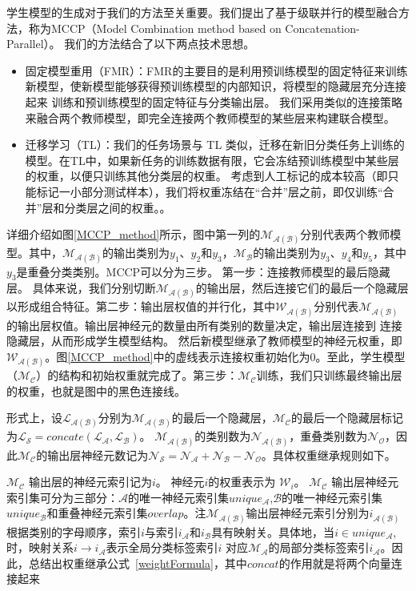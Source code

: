 \documentclass[fontset=macnew,UTF8]{article} %
\begin{document}
学生模型的生成对于我们的方法至关重要。我们提出了基于级联并行的模型融合方法，称为MCCP（Model Combination method based on Concatenation-Parallel）。 我们的方法结合了以下两点技术思想。

\begin{itemize}
	\item 固定模型重用（FMR）\cite{yang2017deep}：FMR的主要目的是利用预训练模型的固定特征来训练新模型，使新模型能够获得预训练模型的内部知识，将模型的隐藏层充分连接起来 训练和预训练模型的固定特征与分类输出层。 我们采用类似的连接策略来融合两个教师模型，即完全连接两个教师模型的某些层来构建联合模型。
	\item 迁移学习（TL）\cite{sung2022lst}：我们的任务场景与 TL 类似，迁移在新旧分类任务上训练的模型。在TL中，如果新任务的训练数据有限，它会冻结预训练模型中某些层的权重，以便只训练其他分类层的权重。 考虑到人工标记的成本较高（即只能标记一小部分测试样本），我们将权重冻结在“合并”层之前，即仅训练“合并”层和分类层之间的权重。。
\end{itemize}

详细介绍如图\ref{MCCP_method}所示，图中第一列的$\mathcal{M_{A(B)}}$分别代表两个教师模型。其中，$\mathcal{M_{A(B)}}$的输出类别为$\mathit{y_{1}}$、$\mathit{y_{2}}$和$\mathit{y_{3}}$，$\mathcal{M_{B}}$的输出类别为$\mathit{y_{3}}$、$\mathit{y_{4}}$和$\mathit{y_{5}}$，其中$\mathit{y_{3}}$是重叠分类类别。MCCP可以分为三步。 第一步：连接教师模型的最后隐藏层。 具体来说，我们分别切断$\mathcal{M_{A(B)}}$的输出层，然后连接它们的最后一个隐藏层以形成组合特征。第二步：输出层权值的并行化，其中$\mathcal{W_{A(B)}}$分别代表$\mathcal{M_{A(B)}}$的输出层权值。输出层神经元的数量由所有类别的数量决定，输出层连接到 连接隐藏层，从而形成学生模型结构。 然后新模型继承了教师模型的神经元权重，即$\mathcal{W_{A(B)}}$。图\ref{MCCP_method}中的虚线表示连接权重初始化为0。至此，学生模型（$\mathcal{M_{C}}$）的结构和初始权重就完成了。第三步：$\mathcal{M_{C}}$训练，我们只训练最终输出层的权重，也就是图中的黑色连接线。

形式上，设$\mathcal{L_{A(B)}}$分别为$\mathcal{M_{A(B)}}$的最后一个隐藏层，$\mathcal{M_{C}}$的最后一个隐藏层标记为$\mathcal{L_S} = \mathit{concate}(\mathcal{L_A,L_B})$。 $\mathcal{M_{A(B)}}$的类别数为$\mathcal{N_{A(B)}}$，重叠类别数为$\mathcal{N_O}$，因此$\mathcal{M_{C}}$的输出层神经元数记为$\mathcal{N_S=N_A+N_B-N_O}$。具体权重继承规则如下。

$\mathcal{M_{C}}$ 输出层的神经元索引记为$\mathit{i}$。 神经元$\mathit{i}$的权重表示为 $\mathcal{W}_i$。 $\mathcal{M_{C}}$ 输出层神经元索引集可分为三部分：$\mathcal{A}$的唯一神经元索引集$\mathit{unique_\mathcal{A}}$,$\mathcal{B}$的唯一神经元索引集$\mathit{unique_\mathcal{B}}$和重叠神经元索引集$\mathit{overlap}$。注$\mathcal{M_{A(B)}}$输出层神经元索引分别为${i_{\mathcal{A(B)}}}$根据类别的字母顺序，索引$\mathit{i}$与索引$i_\mathcal{A}$和$i_\mathcal{B}$具有映射关。具体地，当$i \in unique_\mathcal{A}$,时，映射关系$i  \to  i_\mathcal{A}$表示全局分类标签索引$\mathit{i}$ 对应$\mathcal{M_A}$的局部分类标签索引$i_\mathcal{A}$。因此，总结出权重继承公式~\ref{weightFormula}，其中$\mathit{concat}$的作用就是将两个向量连接起来
\end{document}
